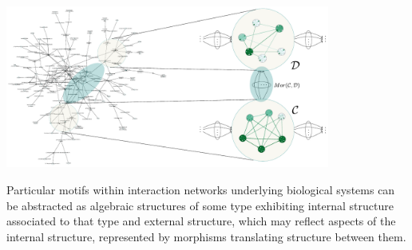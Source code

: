 \begin{frame}
\centering\includegraphics[width=0.8\textwidth]{fig/biograph.pdf}

Particular motifs within interaction networks underlying biological systems can be abstracted as algebraic structures of some type exhibiting internal structure associated to that type and external structure, which may reflect aspects of the internal structure, represented by morphisms translating structure between them.
\end{frame}